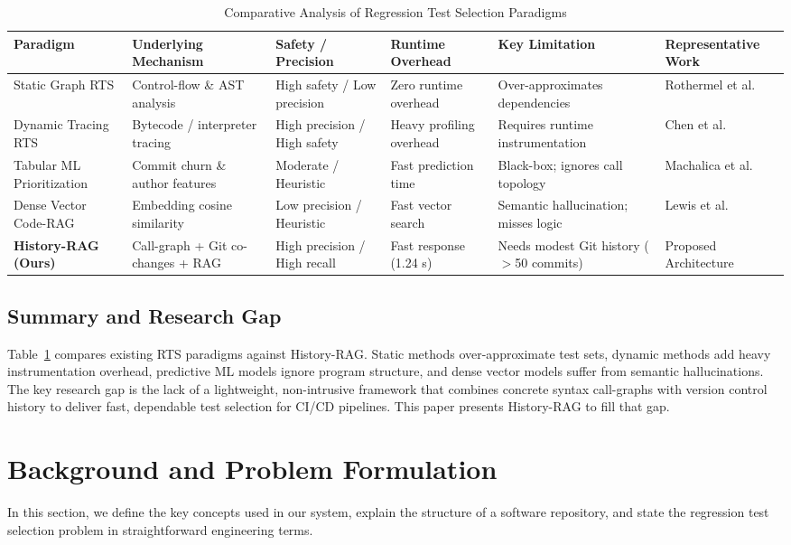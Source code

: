 \documentclass[12pt,onecolumn,draftclsnofoot]{IEEEtran}
\begin{document}
\begin{table}[h]
\centering
\caption{Comparative Analysis of Regression Test Selection Paradigms}
\label{tab:related_summary}
\begin{tabular}{@{}llllll@{}}
\toprule
\textbf{Paradigm} & \textbf{Underlying Mechanism} & \textbf{Safety / Precision} & \textbf{Runtime Overhead} & \textbf{Key Limitation} & \textbf{Representative Work} \\ \midrule
Static Graph RTS & Control-flow \& AST analysis & High safety / Low precision & Zero runtime overhead & Over-approximates dependencies & Rothermel et al.~\cite{rothermel1997safe} \\
Dynamic Tracing RTS & Bytecode / interpreter tracing & High precision / High safety & Heavy profiling overhead & Requires runtime instrumentation & Chen et al.~\cite{chen2019test} \\
Tabular ML Prioritization & Commit churn \& author features & Moderate / Heuristic & Fast prediction time & Black-box; ignores call topology & Machalica et al.~\cite{machalica2019predictive} \\
Dense Vector Code-RAG & Embedding cosine similarity & Low precision / Heuristic & Fast vector search & Semantic hallucination; misses logic & Lewis et al.~\cite{lewis2020retrieval} \\
\textbf{History-RAG (Ours)} & Call-graph + Git co-changes + RAG & High precision / High recall & Fast response (1.24 s) & Needs modest Git history ($>$50 commits) & Proposed Architecture \\ \bottomrule
\end{tabular}
\end{table}

\subsection{Summary and Research Gap}
Table~\ref{tab:related_summary} compares existing RTS paradigms against History-RAG. Static methods over-approximate test sets, dynamic methods add heavy instrumentation overhead, predictive ML models ignore program structure, and dense vector models suffer from semantic hallucinations. The key research gap is the lack of a lightweight, non-intrusive framework that combines concrete syntax call-graphs with version control history to deliver fast, dependable test selection for CI/CD pipelines. This paper presents History-RAG to fill that gap.

\section{Background and Problem Formulation}
\label{sec:background}
In this section, we define the key concepts used in our system, explain the structure of a software repository, and state the regression test selection problem in straightforward engineering terms.
\end{document}
